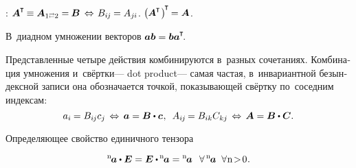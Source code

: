 \begin{otherlanguage}{russian}
:
${\bm{A}^{\hspace{-0.05em}\T} \hspace{-0.15ex} \equiv \bm{A}_{1 \scalebox{0.6}[0.8]{$\rightleftarrows$} 2} = \hspace{-0.1ex} \bm{B}
\hspace{.4ex}\Leftrightarrow\hspace{.25ex}
B_{i\hspace{-0.1ex}j} \hspace{-0.1ex} = A_{j\hspace{-0.06ex}i}}$.
${\bigl( \hspace{-0.1ex} \bm{A}^{\hspace{-0.05em}\T} \hspace{.15ex} \bigr)^{\hspace{-0.25ex}\T} \hspace{-0.2ex} = \bm{A}}$.

В~диадном умножении векторов ${\bm{a} \bm{b} = \bm{b} \bm{a} ^{\hspace{-0.05em}\T}\hspace{-0.4ex}}$.


Представленные четыре действия комбинируются в~разных сочетаниях. Комбинация умножения и~свёртки\:--- dot product\:--- самая частая, в~инвариантной безындексной записи она обозначается точкой, показывающей свёртку по~соседним индексам:
\begin{equation}
a_i \hspace{-0.1ex} = B_{i\hspace{-0.1ex}j} c_j \,\Leftrightarrow\, \bm{a} = \bm{B} \dotp \bm{c} \hspace{.1ex}, \;\:
A_{i\hspace{-0.1ex}j} \hspace{-0.2ex} = B_{ik} C_{kj} \,\Leftrightarrow\, \bm{A} = \bm{B} \dotp \bm{C}.
\end{equation}

Определяющее свойство единичного тензора

\nopagebreak\vspace{-0.15em}\begin{equation}\label{identifyofidentitytensor}
{^\mathrm{n}\hspace{-0.2ex}\bm{a}} \dotp \bm{E} = \bm{E} \dotp \hspace{-0.15ex} {^\mathrm{n}\hspace{-0.2ex}\bm{a}} = {^\mathrm{n}\hspace{-0.2ex}\bm{a}} \;\:\:
\forall \, {^\mathrm{n}\hspace{-0.2ex}\bm{a}} \;\; \forall \hspace{.1ex} \mathrm{n \!>\! 0}
\hspace{.1ex}.
\end{equation}


\end{otherlanguage}
